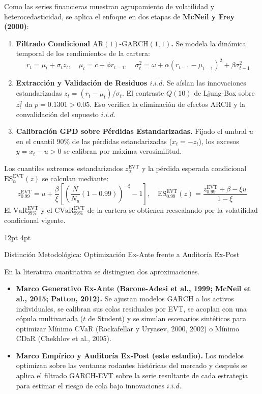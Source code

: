 \documentclass[11pt,a4paper]{article}
\makeatletter
\renewcommand\subsection{\@startsection{subsection}{2}{\z@}%
  {12pt \@plus 2pt \@minus 1pt}%
  {4pt}%
  {\raggedright\normalsize\bfseries\color{navyblue}}}
\makeatother
\begin{document}
Como las series financieras muestran agrupamiento de volatilidad y heterocedasticidad, se aplica el enfoque en dos etapas de \textbf{McNeil y Frey (2000)}:
\begin{enumerate}
    \item \textbf{Filtrado Condicional $\text{AR}(1)\text{-GARCH}(1,1)$.} Se modela la dinámica temporal de los rendimientos de la cartera:
    \begin{equation}
    r_t = \mu_t + \sigma_t z_t, \quad \mu_t = c + \phi r_{t-1}, \quad \sigma_t^2 = \omega + \alpha (r_{t-1} - \mu_{t-1})^2 + \beta \sigma_{t-1}^2
    \end{equation}
    \item \textbf{Extracción y Validación de Residuos $i.i.d.$} Se aíslan las innovaciones estandarizadas $z_t = (r_t - \mu_t) / \sigma_t$. El contraste $Q(10)$ de Ljung-Box sobre $z_t^2$ da $p = 0.1301 > 0.05$. Eso verifica la eliminación de efectos ARCH y la convalidación del supuesto $i.i.d.$
    \item \textbf{Calibración GPD sobre Pérdidas Estandarizadas.} Fijado el umbral $u$ en el cuantil $90\%$ de las pérdidas estandarizadas ($x_t = -z_t$), los excesos $y = x_t - u > 0$ se calibran por máxima verosimilitud.
\end{enumerate}

Los cuantiles extremos estandarizados $z_{\alpha}^{\text{EVT}}$ y la pérdida esperada condicional $\text{ES}_{\alpha}^{\text{EVT}}(z)$ se calculan mediante:
\begin{equation}
z_{0.99}^{\text{EVT}} = u + \frac{\beta}{\xi} \left[ \left(\frac{N}{N_u} (1 - 0.99)\right)^{-\xi} - 1 \right], \quad \text{ES}_{0.99}^{\text{EVT}}(z) = \frac{z_{0.99}^{\text{EVT}} + \beta - \xi u}{1 - \xi}
\end{equation}
El $\text{VaR}_{99\%}^{\text{EVT}}$ y el $\text{CVaR}_{99\%}^{\text{EVT}}$ de la cartera se obtienen reescalando por la volatilidad condicional vigente.

\subsection{Distinción Metodológica: Optimización Ex-Ante frente a Auditoría Ex-Post}

En la literatura cuantitativa se distinguen dos aproximaciones.
\begin{itemize}
    \item \textbf{Marco Generativo Ex-Ante (Barone-Adesi et al., 1999; McNeil et al., 2015; Patton, 2012).} Se ajustan modelos GARCH a los activos individuales, se calibran sus colas residuales por EVT, se acoplan con una cópula multivariada ($t$ de Student) y se simulan escenarios sintéticos para optimizar Mínimo CVaR (Rockafellar y Uryasev, 2000, 2002) o Mínimo CDaR (Chekhlov et al., 2005).
    \item \textbf{Marco Empírico y Auditoría Ex-Post (este estudio).} Los modelos optimizan sobre las ventanas rodantes históricas del mercado y después se aplica el filtrado GARCH-EVT sobre la serie resultante de cada estrategia para estimar el riesgo de cola bajo innovaciones $i.i.d.$
\end{itemize}
\end{document}
